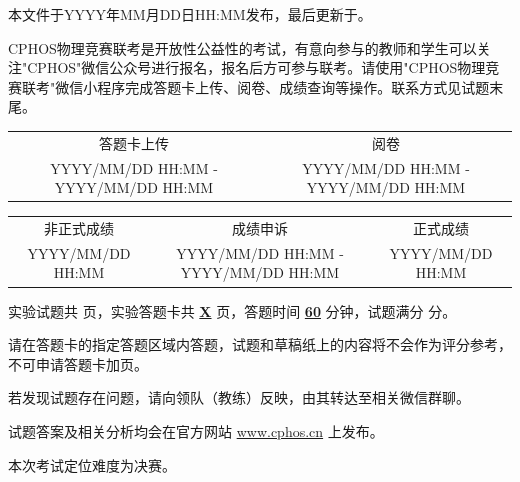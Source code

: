 \documentclass[answer]{cphos-e}
\begin{document}

\maketitlepage

\begin{examonly}
{\kaiti\small 本文件于YYYY年MM月DD日HH:MM发布，最后更新于\compiletime 。}

{\kaiti\small CPHOS物理竞赛联考是开放性公益性的考试，有意向参与的教师和学生可以关注"CPHOS"微信公众号进行报名，报名后方可参与联考。请使用"CPHOS物理竞赛联考"微信小程序完成答题卡上传、阅卷、成绩查询等操作。联系方式见试题末尾。}
\end{examonly}
\begin{examschedule}
\begin{tabular}{@{}cc@{}}
    答题卡上传 & 阅卷 \\
    YYYY/MM/DD HH:MM - YYYY/MM/DD HH:MM & YYYY/MM/DD HH:MM - YYYY/MM/DD HH:MM \\
\end{tabular}

\vspace{0.3em}

\begin{tabular}{@{}ccc@{}}
    非正式成绩 & 成绩申诉 & 正式成绩 \\
    YYYY/MM/DD HH:MM & YYYY/MM/DD HH:MM - YYYY/MM/DD HH:MM & YYYY/MM/DD HH:MM \\
\end{tabular}
\end{examschedule}

\begin{examnotes}
    \item 实验试题共 \textbf{\underline{\cphostotalpages}} 页，实验答题卡共 \textbf{\underline{X}} 页，答题时间 \textbf{\underline{60}} 分钟，试题满分 \textbf{\underline{\cphostotalscore}} 分。
    \item 请在答题卡的指定答题区域内答题，试题和草稿纸上的内容将不会作为评分参考，不可申请答题卡加页。
    \item 若发现试题存在问题，请向领队（教练）反映，由其转达至相关微信群聊。
    \item 试题答案及相关分析均会在官方网站 \url{www.cphos.cn} 上发布。
    \item 本次考试定位难度为决赛。
\end{examnotes}
\vspace{1em}
\end{document}
